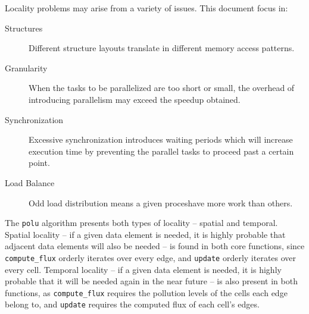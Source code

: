 \documentclass[abstract=on,9pt,twocolumn]{scrartcl}
\begin{document}
Locality problems may arise from a variety of issues. This document focus in:
\begin{description}
\item[Structures]{Different structure layouts translate in different memory access patterns.}%
\item[Granularity]{When the tasks to be parallelized are too short or small, the overhead of introducing parallelism may exceed the speedup obtained.}%
\item[Synchronization]{Excessive synchronization introduces waiting periods which will increase execution time by preventing the parallel tasks to proceed past a certain point.}%
\item[Load Balance]{Odd load distribution means a given proceshave more work than others.}%
\end{description}

The \texttt{polu} algorithm presents both types of locality -- spatial and temporal. Spatial locality -- if a given data element is needed, it is highly probable that adjacent data elements will also be needed -- is found in both core functions, since \texttt{compute\_flux} orderly iterates over every edge, and \texttt{update} orderly iterates over every cell. Temporal locality -- if a given data element is needed, it is highly probable that it will be needed again in the near future -- is also present in both functions, as \texttt{compute\_flux} requires the pollution levels of the cells each edge belong to, and \texttt{update} requires the computed flux of each cell's edges.
\end{document}
